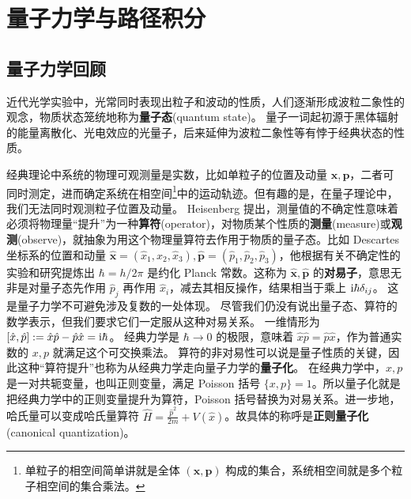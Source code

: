 \chapter{量子力学与路径积分}

\section{量子力学回顾}

近代光学实验中，光常同时表现出粒子和波动的性质，人们逐渐形成波粒二象性的观念，物质状态笼统地称为\textbf{量子态}(quantum state)。
量子一词起初源于黑体辐射的能量离散化、光电效应的光量子，后来延伸为波粒二象性等有悖于经典状态的性质。

经典理论中系统的物理可观测量是实数，比如单粒子的位置及动量 $\bm x,\bm p$，二者可同时测定，进而确定系统在相空间\footnote{单粒子的相空间简单讲就是全体 $(\bm x,\bm p)$ 构成的集合，系统相空间就是多个粒子相空间的集合乘法。}中的运动轨迹。但有趣的是，在量子理论中，我们无法同时观测粒子位置及动量。
Heisenberg 提出，测量值的不确定性意味着必须将物理量“提升”为一种\textbf{算符}(operator)，对物质某个性质的\textbf{测量}(measure)或\textbf{观测}(observe)，就抽象为用这个物理量算符去作用于物质的量子态。比如 Descartes 坐标系的位置和动量 $\hat{\bm x}=(\hat x_1,\hat x_2,\hat x_3),\hat{\bm p}=(\hat p_1,\hat p_2,\hat p_3)$，他根据有关不确定性的实验和研究提炼出
$\hbar=h/2\pi$ 是约化 Planck 常数。这称为 $\hat{\bm x},\hat{\bm p}$ 的\textbf{对易子}，意思无非是对量子态先作用 $\hat p_j$ 再作用 $\hat x_i$，减去其相反操作，结果相当于乘上 $\mathrm{i}\hbar\delta_{ij}$。
这是量子力学不可避免涉及复数的一处体现。
尽管我们仍没有说出量子态、算符的数学表示，但我们要求它们一定服从这种对易关系。
一维情形为 $[\hat x,\hat p]:=\hat x\hat p - \hat p\hat x = \mathrm{i}\hbar$。
经典力学是 $\hbar\to 0$ 的极限，意味着 $\hat x\hat p=\hat p\hat x$，作为普通实数的 $x,p$ 就满足这个可交换乘法。
算符的非对易性可以说是量子性质的关键，因此这种“算符提升”也称为从经典力学走向量子力学的\textbf{量子化}。
在经典力学中，$x,p$ 是一对共轭变量，也叫正则变量，满足 Poisson 括号 $\{x,p\}=1$。所以量子化就是把经典力学中的正则变量提升为算符，Poisson 括号替换为对易关系。进一步地，哈氏量可以变成哈氏量算符 $\hat H=\frac{\hat p^2}{2m}+V(\hat x)$。故具体的称呼是\textbf{正则量子化}(canonical quantization)。

